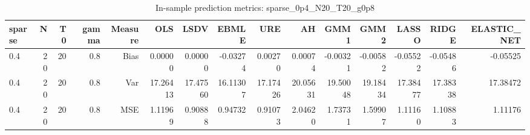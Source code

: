 \begin{table}[!htbp]\centering
\caption{In-sample prediction metrics: sparse_0p4_N20_T20_g0p8}
\label{tab:table2_sparse_0p4_N20_T20_g0p8}
\begin{tabular}{lrrrrrrrrrrrrrr}
\hline
sparse & N & T0 & gamma & Measure & OLS & LSDV & EBMLE & URE & AH & GMM1 & GMM2 & LASSO & RIDGE & ELASTIC_NET \\
\hline
0.4 & 20 & 20 & 0.8 & Bias & 0.00000 & 0.00000 & -0.03274 & 0.00270 & 0.00074 & -0.00321 & -0.00582 & -0.05522 & -0.05486 & -0.05525 \\
0.4 & 20 & 20 & 0.8 & Var & 17.26413 & 17.47560 & 16.11307 & 17.17426 & 20.05631 & 19.50048 & 19.18434 & 17.38477 & 17.38338 & 17.38472 \\
0.4 & 20 & 20 & 0.8 & MSE & 1.11969 & 0.90888 & 0.94732 & 0.91073 & 2.04620 & 1.73731 & 1.59907 & 1.11160 & 1.10883 & 1.11176 \\
\hline
\end{tabular}
\end{table}

